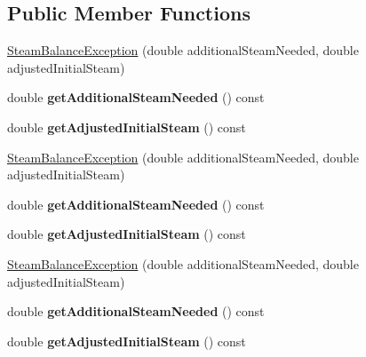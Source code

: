 \subsection*{Public Member Functions}
\begin{DoxyCompactItemize}
\item 
\hyperlink{class_steam_balance_exception_ac86eb72f6c1e138ae22f9ab97646e8b3}{Steam\+Balance\+Exception} (double additional\+Steam\+Needed, double adjusted\+Initial\+Steam)
\item 
\mbox{\label{class_steam_balance_exception_aa6f652dc20ef1b758a0cecc284d09eb2}} 
double {\bfseries get\+Additional\+Steam\+Needed} () const
\item 
\mbox{\label{class_steam_balance_exception_a2fb35005dea522a8e05af954e9a3ed97}} 
double {\bfseries get\+Adjusted\+Initial\+Steam} () const
\item 
\hyperlink{class_steam_balance_exception_ac86eb72f6c1e138ae22f9ab97646e8b3}{Steam\+Balance\+Exception} (double additional\+Steam\+Needed, double adjusted\+Initial\+Steam)
\item 
\mbox{\label{class_steam_balance_exception_aa6f652dc20ef1b758a0cecc284d09eb2}} 
double {\bfseries get\+Additional\+Steam\+Needed} () const
\item 
\mbox{\label{class_steam_balance_exception_a2fb35005dea522a8e05af954e9a3ed97}} 
double {\bfseries get\+Adjusted\+Initial\+Steam} () const
\item 
\hyperlink{class_steam_balance_exception_ac86eb72f6c1e138ae22f9ab97646e8b3}{Steam\+Balance\+Exception} (double additional\+Steam\+Needed, double adjusted\+Initial\+Steam)
\item 
\mbox{\label{class_steam_balance_exception_aa6f652dc20ef1b758a0cecc284d09eb2}} 
double {\bfseries get\+Additional\+Steam\+Needed} () const
\item 
\mbox{\label{class_steam_balance_exception_a2fb35005dea522a8e05af954e9a3ed97}} 
double {\bfseries get\+Adjusted\+Initial\+Steam} () const
\end{DoxyCompactItemize}
